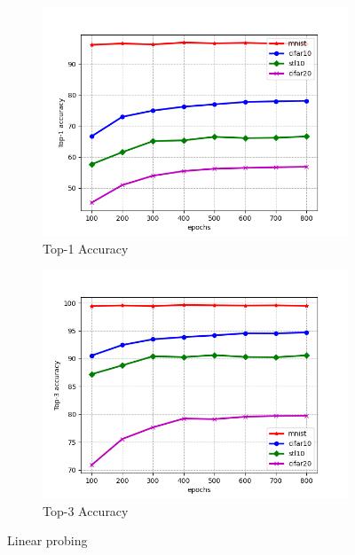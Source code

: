\documentclass{article}
\begin{document}
\begin{figure}[hbt!]
     \centering
     \begin{subfigure}[b]{.45\textwidth}
         \centering
         \includegraphics[width=\textwidth]{images/linear_probing_top1.png}
         \caption{Top-1 Accuracy}
         \label{fig:top1}
     \end{subfigure}
     \hfill
     \begin{subfigure}[b]{0.45\textwidth}
         \centering
         \includegraphics[width=\textwidth]{images/linear_probing_top3.png}
         \caption{Top-3 Accuracy}
         \label{fig:top3}
     \end{subfigure}
     \caption{Linear probing}
     \label{fig:linear}
\end{figure}
\end{document}
